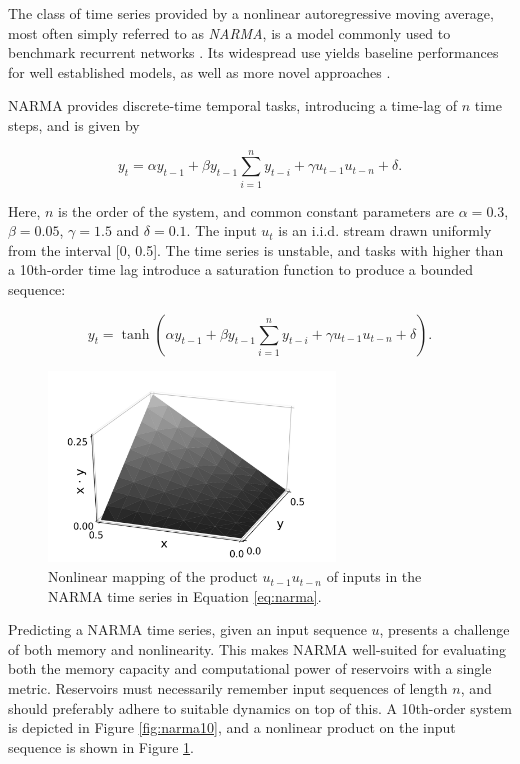The class of time series provided by a nonlinear autoregressive moving average,
most often simply referred to as \textit{NARMA}, is a model commonly used to
benchmark recurrent networks \cite{atiya_new_2000}. Its widespread use yields
baseline performances for well established models, as well as more novel
approaches \cite{verstraeten_experimental_2007, appeltant_information_2011}.

NARMA provides discrete-time temporal tasks, introducing a time-lag of $n$ time
steps, and is given by

\begin{equation}
  y_{t} = \alpha y_{t-1} +
  \beta y_{t-1} \sum_{i=1}^{n}y_{t-i} +
  \gamma u_{t-1}u_{t-n} +
  \delta
  .
  \label{eq:narma}
\end{equation}

Here, $n$ is the order of the system, and common constant parameters are $\alpha
= 0.3$, $\beta = 0.05$, $\gamma = 1.5$ and $\delta = 0.1$. The input $u_{t}$ is
an i.i.d. stream drawn uniformly from the interval [0, 0.5]. The time series is
unstable, and tasks with higher than a 10th-order time lag introduce a
saturation function to produce a bounded sequence:

\begin{equation}
  y_{t} =
  \tanh(
  \alpha y_{t-1} +
  \beta y_{t-1} \sum_{i=1}^{n}y_{t-i} +
  \gamma u_{t-1}u_{t-n} +
  \delta
  )
  .
  \label{eq:narma-tanh}
\end{equation}

\begin{figure}[t!]
  \centering
  \includegraphics[width=3.0in]{figures/NARMA-nonlinearity.png}
  \caption{
    Nonlinear mapping of the product $u_{t-1}u_{t-n}$ of inputs in the NARMA
time series in Equation \protect\ref{eq:narma}.
  }
  \label{fig:narma-nonlinearity}
\end{figure}

Predicting a NARMA time series, given an input sequence $u$, presents a
challenge of both memory and nonlinearity. This makes NARMA well-suited for
evaluating both the memory capacity and computational power of reservoirs with a
single metric. Reservoirs must necessarily remember input sequences of length
$n$, and should preferably adhere to suitable dynamics on top of this. A
10th-order system is depicted in Figure \ref{fig:narma10}, and a nonlinear
product on the input sequence is shown in Figure \ref{fig:narma-nonlinearity}.

